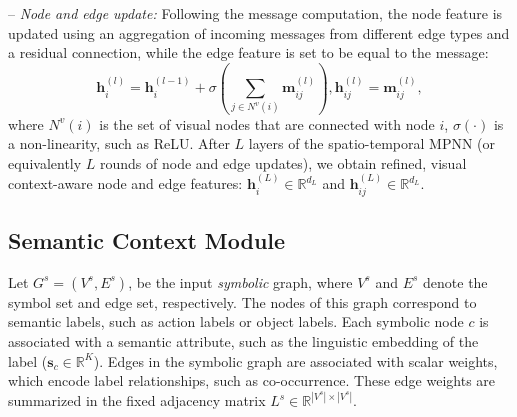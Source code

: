 \documentclass[runningheads]{llncs}
\newcommand{\R}{\mathbb{R}}
\newcommand{\h}{\mathbf{h}}
\newcommand{\s}{\mathbf{s}}
\newcommand{\mysubparagraph}[1]{\smallskip\noindent-- \emph{#1:}}
\begin{document}
\mysubparagraph{Node and edge update} Following the message computation, the 
node feature is updated using an aggregation of incoming messages from different edge types and a residual 
connection, while the 
edge feature is set to be equal to the message:
\begin{equation}
\h _ { i }^{(l)} = \h _ { i }^{(l-1)} + \sigma\left(\sum_{j \in N^v(i)} \mathbf{m}^{(l)}_{ij}\right),
\h _ { ij }^{(l)} = \mathbf{m}^{(l)}_{ij},
\end{equation}
where $N^v(i)$ is the set of visual nodes that are connected with node $i$, $\sigma(\cdot)$ is a non-linearity, such as ReLU. After $L$ layers of the spatio-temporal MPNN (or equivalently $L$ rounds of node and edge 
updates), we obtain refined, visual context-aware node and edge 
features: $\h _ { i }^{(L)}\in \R^{d_L}$ and $\h _ { ij }
^{(L)} \in \R^{d_L}$.

\subsection{Semantic Context Module}
\label{subsec:semantic_context}

Let  $G^s = (V^s, E^s)$, be the input \emph{symbolic} graph, where $V^s$ and 
$E^s$ denote the symbol set and edge set, respectively. The nodes of this 
graph correspond to semantic labels, such as action labels or object labels. 
Each symbolic node $c$ is associated with a semantic attribute, such as the 
linguistic embedding of the label ($\s_c \in \R^K$). Edges in the symbolic graph are associated with scalar weights, which encode label relationships, such as co-occurrence. 
These edge weights are summarized in the fixed 
adjacency matrix $L^s \in \mathbb{R}^{|V^s| \times |V^s|}$.
\end{document}
